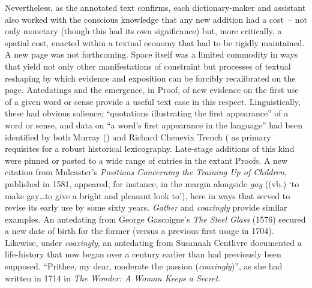\documentclass[output=paper,colorlinks,citecolor=brown,arabicfont,chinesefont]{langscibook}
\begin{document}
Nevertheless, as the annotated text confirms, each dictionary-maker and assistant also worked with the conscious knowledge that any new addition had a cost~-- not only monetary (though this had its own significance) but, more critically, a spatial cost, enacted within a textual economy that had to be rigidly maintained. A new page was not forthcoming. Space itself was a limited commodity in ways that yield not only other manifestations of constraint but processes of textual reshaping by which evidence and exposition can be forcibly recalibrated on the page. Antedatings and the emergence, in Proof, of new evidence on the first use of a given word or sense provide a useful text case in this respect. Linguistically, these had obvious salience; “quotations illustrating the first appearance” of a word or sense, and data on “a word’s first appearance in the language” had been identified by both Murray (\citeyear[46]{Murray1900}) and Richard Chenevix Trench (\citet[23]{Trench1857} as primary requisites for a robust historical lexicography. Late-stage additions of this kind were pinned or pasted to a wide range of entries in the extant Proofs. A new citation from Mulcaster’s \emph{Positions Concerning the Training Up of Children}, published in 1581, appeared, for instance, in the margin alongside \emph{gay} ((vb.) ‘to make gay…to give a bright and pleasant look to’), here in ways that served to revise its early use by some sixty years. \emph{Gather} and \emph{coaxingly} provide similar examples. An antedating from George Gascoigne’s \emph{The Steel Glass} (1576) secured a new date of birth for the former (versus a previous first usage in 1704). Likewise, under \emph{coaxingly}, an antedating from Susannah Centlivre documented a life-history that now began over a century earlier than had previously been supposed. “Prithee, my dear, moderate the passion (\emph{coaxingly})”, as she had written in 1714 in \emph{The Wonder: A Woman Keeps a Secret}.
\end{document}
